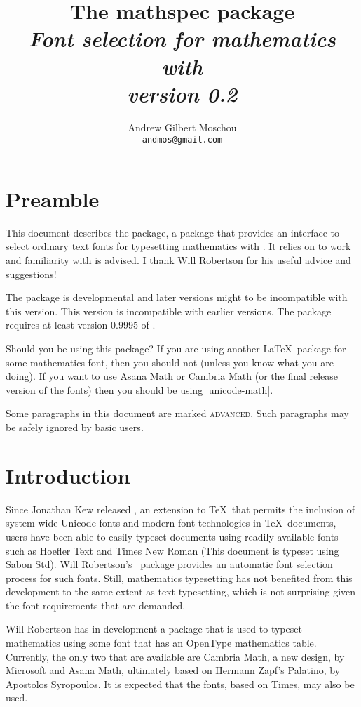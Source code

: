 \documentclass{ltxdockit}
\title{The \textsf{\spotcolor mathspec}
  package\\[0.25em]\mdseries\itshape\normalsize Font selection for
  mathematics with \XeLaTeX\\[1ex]\mdseries\upshape version 0.2}
\author{Andrew Gilbert Moschou\\\texttt{andmos@gmail.com}}
\begin{document}
\maketitle

\tableofcontents

\section{Preamble}

This document describes the  package, a package that
provides an interface to select ordinary text fonts for typesetting
mathematics with \XeLaTeX. It relies on  to work and
familiarity with  is advised. I thank Will Robertson for
his useful advice and suggestions!

The package is developmental and later versions might to be
incompatible with this version. This version is incompatible with
earlier versions. The package requires at least version 0.9995 of
\XeTeX.

Should you be using this package? If you are using another \LaTeX\
package for some mathematics font, then you should not (unless you
know what you are doing). If you want to use Asana Math or Cambria
Math (or the final release version of the \acr{STIX} fonts) then you
should be using |unicode-math|.

Some paragraphs in this document are marked \textsc{\spotcolor
  advanced}. Such paragraphs may be safely ignored by basic users.

\section{Introduction}

Since Jonathan Kew released \XeTeX, an extension to \TeX\ that permits
the inclusion of system wide Unicode fonts and modern font
technologies in \TeX\ documents, users have been able to easily
typeset documents using readily available fonts such as Hoefler Text
and Times New Roman (This document is typeset using Sabon \acr{LT}
Std). Will Robertson’s \XeLaTeX\ package \sty{fontspec} provides an
automatic font selection process for such fonts. Still, mathematics
typesetting has not benefited from this development to the same extent
as text typesetting, which is not surprising given the font
requirements that are demanded.

Will Robertson has in development a package  that is
used to typeset mathematics using some font that has an OpenType
mathematics table. Currently, the only two that are available are
Cambria Math, a new design, by Microsoft and Asana Math, ultimately
based on Hermann Zapf’s Palatino, by Apostolos Syropoulos. It is
expected that the \acr{STIX} fonts, based on Times, may also be used.
\end{document}
